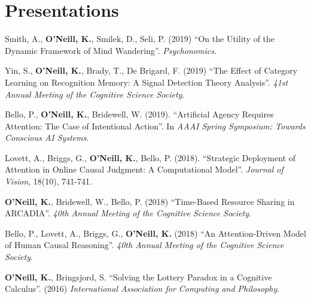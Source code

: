\section{Presentations}

Smith, A., \textbf{O'Neill, K.}, Smilek, D., Seli, P. (2019) ``On the
Utility of the Dynamic Framework of Mind Wandering''. \emph{Psychonomics}.

Yin, S., \textbf{O'Neill, K.}, Brady, T., De Brigard, F. (2019) ``The
Effect of Category Learning on Recognition Memory: A Signal Detection
Theory Analysis''. \emph{41st Annual Meeting of the Cognitive Science
Society}.

Bello, P., \textbf{O'Neill, K.}, Bridewell, W. (2019). ``Artificial
Agency Requires Attention: The Case of Intentional
Action''. In \emph{AAAI Spring Symposium: Towards Conscious AI
Systems}.

Lovett, A., Briggs, G., \textbf{O'Neill, K.}, Bello,
P. (2018). ``Strategic Deployment of Attention in Online Causal
Judgment: A Computational Model''. \emph{Journal of Vision}, 18(10),
741-741.

\textbf{O'Neill, K.}, Bridewell, W., Bello, P. (2018) ``Time-Based
Resource Sharing in ARCADIA''. \emph{40th Annual Meeting of the
  Cognitive Science Society}.

Bello, P., Lovett, A., Briggs, G., \textbf{O'Neill, K.} (2018) ``An
Attention-Driven Model of Human Causal Reasoning''. \emph{40th Annual
Meeting of the Cognitive Science Society}.
  
\textbf{O’Neill, K.}, Bringsjord, S. ``Solving the Lottery Paradox in a
Cognitive Calculus''. (2016) \emph{International Association for
Computing and Philosophy}.
